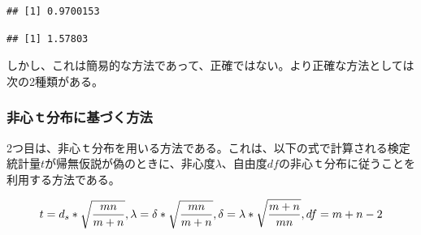 \documentclass[
  ja=standard, xelatex, base=12pt]{bxjsreport}
\newenvironment{Shaded}{\begin{snugshade}}{\end{snugshade}}
\newcommand{\CommentTok}[1]{\textcolor[rgb]{0.56,0.35,0.01}{\textit{#1}}}
\newcommand{\DecValTok}[1]{\textcolor[rgb]{0.00,0.00,0.81}{#1}}
\newcommand{\FloatTok}[1]{\textcolor[rgb]{0.00,0.00,0.81}{#1}}
\newcommand{\FunctionTok}[1]{\textcolor[rgb]{0.00,0.00,0.00}{#1}}
\newcommand{\NormalTok}[1]{#1}
\newcommand{\OtherTok}[1]{\textcolor[rgb]{0.56,0.35,0.01}{#1}}
\newcommand{\SpecialCharTok}[1]{\textcolor[rgb]{0.00,0.00,0.00}{#1}}
\begin{document}
\begin{Shaded}
\end{Shaded}

\begin{verbatim}
## [1] 0.9700153
\end{verbatim}

\begin{Shaded}
\end{Shaded}

\begin{verbatim}
## [1] 1.57803
\end{verbatim}

しかし、これは簡易的な方法であって、正確ではない。より正確な方法としては次の2種類がある。

\hypertarget{ux975eux5fc3uxff54ux5206ux5e03ux306bux57faux3065ux304fux65b9ux6cd5}{%
\subsubsection{非心ｔ分布に基づく方法}\label{ux975eux5fc3uxff54ux5206ux5e03ux306bux57faux3065ux304fux65b9ux6cd5}}

2つ目は、非心ｔ分布を用いる方法である。これは、以下の式で計算される検定統計量\(t\)が帰無仮説が偽のときに、非心度\(λ\)、自由度\(df\)の非心ｔ分布に従うことを利用する方法である。

\[
t=d_s*\sqrt{\frac{mn}{m+n}},\\
\lambda=\delta*\sqrt{\frac{mn}{m+n}},\\
\delta=\lambda*\sqrt{\frac{m+n}{mn}},\\
df=m+n-2
\]
\end{document}
